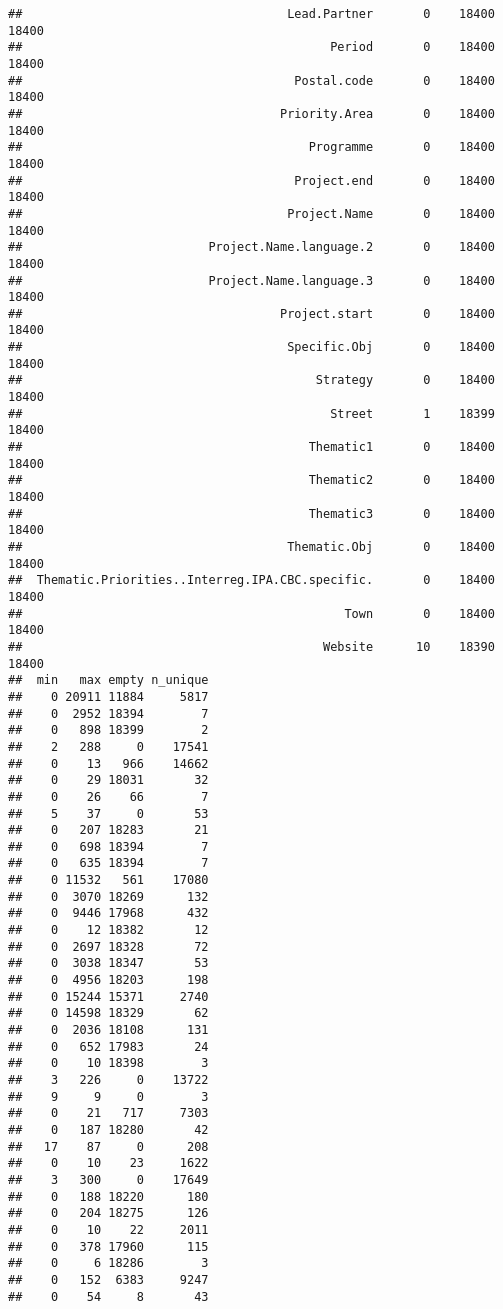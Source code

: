\documentclass[]{article}
\begin{document}
\begin{verbatim}
##                                     Lead.Partner       0    18400 18400
##                                           Period       0    18400 18400
##                                      Postal.code       0    18400 18400
##                                    Priority.Area       0    18400 18400
##                                        Programme       0    18400 18400
##                                      Project.end       0    18400 18400
##                                     Project.Name       0    18400 18400
##                          Project.Name.language.2       0    18400 18400
##                          Project.Name.language.3       0    18400 18400
##                                    Project.start       0    18400 18400
##                                     Specific.Obj       0    18400 18400
##                                         Strategy       0    18400 18400
##                                           Street       1    18399 18400
##                                        Thematic1       0    18400 18400
##                                        Thematic2       0    18400 18400
##                                        Thematic3       0    18400 18400
##                                     Thematic.Obj       0    18400 18400
##  Thematic.Priorities..Interreg.IPA.CBC.specific.       0    18400 18400
##                                             Town       0    18400 18400
##                                          Website      10    18390 18400
##  min   max empty n_unique
##    0 20911 11884     5817
##    0  2952 18394        7
##    0   898 18399        2
##    2   288     0    17541
##    0    13   966    14662
##    0    29 18031       32
##    0    26    66        7
##    5    37     0       53
##    0   207 18283       21
##    0   698 18394        7
##    0   635 18394        7
##    0 11532   561    17080
##    0  3070 18269      132
##    0  9446 17968      432
##    0    12 18382       12
##    0  2697 18328       72
##    0  3038 18347       53
##    0  4956 18203      198
##    0 15244 15371     2740
##    0 14598 18329       62
##    0  2036 18108      131
##    0   652 17983       24
##    0    10 18398        3
##    3   226     0    13722
##    9     9     0        3
##    0    21   717     7303
##    0   187 18280       42
##   17    87     0      208
##    0    10    23     1622
##    3   300     0    17649
##    0   188 18220      180
##    0   204 18275      126
##    0    10    22     2011
##    0   378 17960      115
##    0     6 18286        3
##    0   152  6383     9247
##    0    54     8       43

\end{verbatim}
\end{document}
